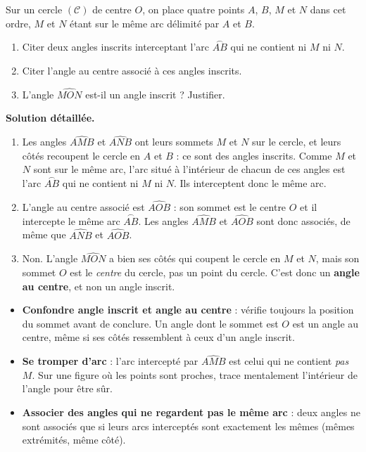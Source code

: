 \documentclass[11pt]{article}
\begin{document}
\begin{exoresolu}
Sur un cercle $(\mathcal{C})$ de centre $O$, on place quatre points $A$, $B$, $M$ et $N$ dans cet ordre, $M$ et $N$ étant sur le même arc délimité par $A$ et $B$.
\begin{enumerate}
\item Citer deux angles inscrits interceptant l'arc $\overset{\frown}{AB}$ qui ne contient ni $M$ ni $N$.
\item Citer l'angle au centre associé à ces angles inscrits.
\item L'angle $\widehat{MON}$ est-il un angle inscrit ? Justifier.
\end{enumerate}
\tcblower
\textbf{Solution détaillée.}
\begin{enumerate}
\item Les angles $\widehat{AMB}$ et $\widehat{ANB}$ ont leurs sommets $M$ et $N$ sur le cercle, et leurs côtés recoupent le cercle en $A$ et $B$ : ce sont des angles inscrits. Comme $M$ et $N$ sont sur le même arc, l'arc situé à l'intérieur de chacun de ces angles est l'arc $\overset{\frown}{AB}$ qui ne contient ni $M$ ni $N$. Ils interceptent donc le même arc.
\item L'angle au centre associé est $\widehat{AOB}$ : son sommet est le centre $O$ et il intercepte le même arc $\overset{\frown}{AB}$. Les angles $\widehat{AMB}$ et $\widehat{AOB}$ sont donc associés, de même que $\widehat{ANB}$ et $\widehat{AOB}$.
\item Non. L'angle $\widehat{MON}$ a bien ses côtés qui coupent le cercle en $M$ et $N$, mais son sommet $O$ est le \emph{centre} du cercle, pas un point du cercle. C'est donc un \textbf{angle au centre}, et non un angle inscrit.
\end{enumerate}
\end{exoresolu}

\begin{attention}
\begin{itemize}
\item \textbf{Confondre angle inscrit et angle au centre} : vérifie toujours la position du sommet avant de conclure. Un angle dont le sommet est $O$ est un angle au centre, même si ses côtés ressemblent à ceux d'un angle inscrit.
\item \textbf{Se tromper d'arc} : l'arc intercepté par $\widehat{AMB}$ est celui qui ne contient \emph{pas} $M$. Sur une figure où les points sont proches, trace mentalement l'intérieur de l'angle pour être sûr.
\item \textbf{Associer des angles qui ne regardent pas le même arc} : deux angles ne sont associés que si leurs arcs interceptés sont exactement les mêmes (mêmes extrémités, même côté).
\end{itemize}
\end{attention}
\end{document}
